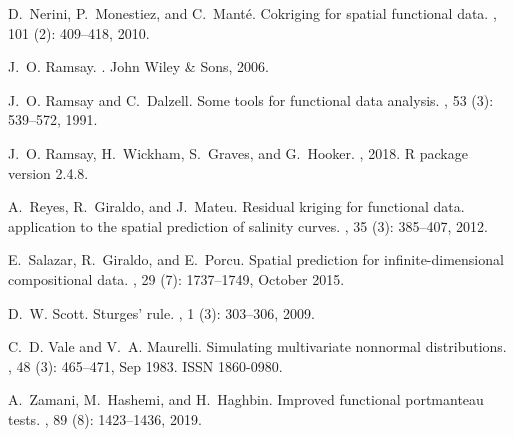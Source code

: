 \documentclass[12pt]{interact}
\theoremstyle{plain}%
\theoremstyle{definition}
\theoremstyle{remark}
\begin{document}
\begin{thebibliography}{25}
	D.~Nerini, P.~Monestiez, and C.~Mant{\'e}.
	\newblock Cokriging for spatial functional data.
	, 101 (2):
	409--418, 2010.
	
	J.~O. Ramsay.
	.
	\newblock John Wiley \& Sons, 2006.
	
	J.~O. Ramsay and C.~Dalzell.
	\newblock Some tools for functional data analysis.
	, 53
	(3): 539--572, 1991.
	
	J.~O. Ramsay, H.~Wickham, S.~Graves, and G.~Hooker.
	, 2018.
	\newblock R package version 2.4.8.
	
	A.~Reyes, R.~Giraldo, and J.~Mateu.
	\newblock Residual kriging for functional data. application to the spatial
	prediction of salinity curves.
	, 35 (3):
	385--407, 2012.
	
	E.~Salazar, R.~Giraldo, and E.~Porcu.
	\newblock Spatial prediction for infinite-dimensional compositional data.
	, 29
	(7): 1737--1749, October 2015.
	
	D.~W. Scott.
	\newblock Sturges' rule.
	,
	1 (3): 303--306, 2009.
	
	C.~D. Vale and V.~A. Maurelli.
	\newblock Simulating multivariate nonnormal distributions.
	, 48 (3): 465--471, Sep 1983.
	\newblock ISSN 1860-0980.
	
	A.~Zamani, M.~Hashemi, and H.~Haghbin.
	\newblock Improved functional portmanteau tests.
	, 89
	(8): 1423--1436, 2019.
	
\end{thebibliography}
\end{document}

